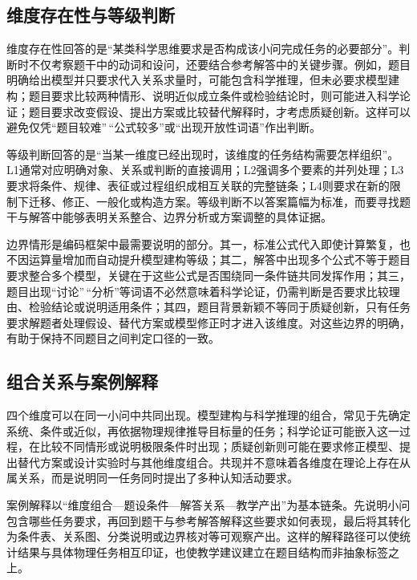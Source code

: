 \documentclass[
  12pt,
  a4paper]{ctexbook}
\begin{document}
\subsection{维度存在性与等级判断}\label{ux7ef4ux5ea6ux5b58ux5728ux6027ux4e0eux7b49ux7ea7ux5224ux65ad}

维度存在性回答的是``某类科学思维要求是否构成该小问完成任务的必要部分''。判断时不仅考察题干中的动词和设问，还要结合参考解答中的关键步骤。例如，题目明确给出模型并只要求代入关系求量时，可能包含科学推理，但未必要求模型建构；题目要求比较两种情形、说明近似成立条件或检验结论时，则可能进入科学论证；题目要求改变假设、提出方案或比较替代解释时，才考虑质疑创新。这样可以避免仅凭``题目较难''\,``公式较多''或``出现开放性词语''作出判断。

等级判断回答的是``当某一维度已经出现时，该维度的任务结构需要怎样组织''。L1通常对应明确对象、关系或判断的直接调用；L2强调多个要素的并列处理；L3要求将条件、规律、表征或过程组织成相互关联的完整链条；L4则要求在新的限制下迁移、修正、一般化或构造方案。等级判断不以答案篇幅为标准，而要寻找题干与解答中能够表明关系整合、边界分析或方案调整的具体证据。

边界情形是编码框架中最需要说明的部分。其一，标准公式代入即使计算繁复，也不因运算量增加而自动提升模型建构等级；其二，解答中出现多个公式不等于题目要求整合多个模型，关键在于这些公式是否围绕同一条件链共同发挥作用；其三，题目出现``讨论''\,``分析''等词语不必然意味着科学论证，仍需判断是否要求比较理由、检验结论或说明适用条件；其四，题目背景新颖不等同于质疑创新，只有任务要求解题者处理假设、替代方案或模型修正时才进入该维度。对这些边界的明确，有助于保持不同题目之间判定口径的一致。

\subsection{组合关系与案例解释}\label{ux7ec4ux5408ux5173ux7cfbux4e0eux6848ux4f8bux89e3ux91ca}

四个维度可以在同一小问中共同出现。模型建构与科学推理的组合，常见于先确定系统、条件或近似，再依据物理规律推导目标量的任务；科学论证可能嵌入这一过程，在比较不同情形或说明极限条件时出现；质疑创新则可能在要求修正模型、提出替代方案或设计实验时与其他维度组合。共现并不意味着各维度在理论上存在从属关系，而是说明同一任务同时提出了多种认知活动要求。

案例解释以``维度组合---题设条件---解答关系---教学产出''为基本链条。先说明小问包含哪些任务要求，再回到题干与参考解答解释这些要求如何表现，最后将其转化为条件表、关系图、分类说明或边界核对等可观察产出。这样的解释路径可以使统计结果与具体物理任务相互印证，也使教学建议建立在题目结构而非抽象标签之上。
\end{document}
